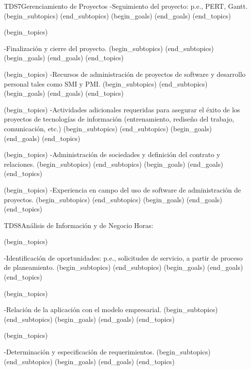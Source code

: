 \begin{BKL2}{TDS7}{Gerenciamiento de Proyectos}
-Seguimiento del proyecto: p.e., PERT, Gantt.
(begin_subtopics)
(end_subtopics)
(begin_goals)
(end_goals)
(end_topics)

 

(begin_topics)

-Finalización y cierre del proyecto.
(begin_subtopics)
(end_subtopics)
(begin_goals)
(end_goals)
(end_topics)

(begin_topics)
-Recursos de administración de proyectos de software y desarrollo personal tales como SMI y PMI.
(begin_subtopics)
(end_subtopics)
(begin_goals)
(end_goals)
(end_topics)

(begin_topics)
-Actividades adicionales requeridas para asegurar el éxito de los proyectos de tecnologías de información (entrenamiento, rediseño del trabajo, comunicación, etc.)
(begin_subtopics)
(end_subtopics)
(begin_goals)
(end_goals)
(end_topics)

(begin_topics)
-Administración de sociedades y definición del contrato y relaciones.
(begin_subtopics)
(end_subtopics)
(begin_goals)
(end_goals)
(end_topics)

(begin_topics)
-Experiencia en campo del uso de software de administración de proyectos.
(begin_subtopics)
(end_subtopics)
(begin_goals)
(end_goals)
(end_topics)



\end{BKL2}



\begin{BKL2}{TDS8}{Análisis de Información y de Negocio}
Horas:
 
(begin_topics)

-Identificación de oportunidades: p.e., solicitudes de servicio, a partir de proceso de planeamiento.
(begin_subtopics)
(end_subtopics)
(begin_goals)
(end_goals)
(end_topics)

 

(begin_topics)

-Relación de la aplicación con el modelo empresarial.
(begin_subtopics)
(end_subtopics)
(begin_goals)
(end_goals)
(end_topics)

 

(begin_topics)

-Determinación y especificación de requerimientos.
(begin_subtopics)
(end_subtopics)
(begin_goals)
(end_goals)
(end_topics)

\end{BKL2}



